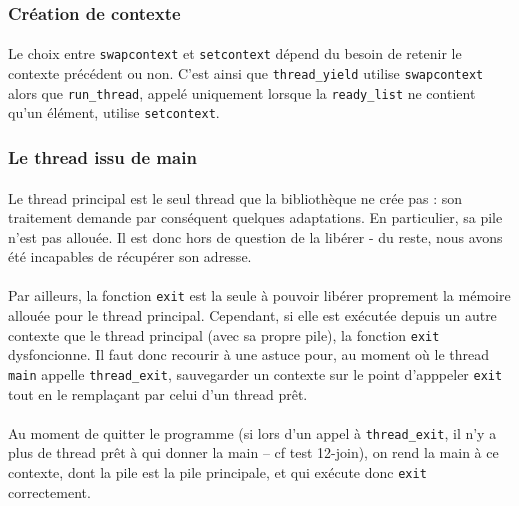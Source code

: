 \subsubsection{Création de contexte}

\paragraph{}
Le choix entre \texttt{swapcontext} et \texttt{setcontext} dépend du
 besoin de retenir le contexte précédent ou non. C'est ainsi que 
\texttt{thread\_yield} utilise \texttt{swapcontext} alors que 
\texttt{run\_thread}, appelé uniquement lorsque la \texttt{ready\_list}
ne contient qu'un élément, utilise \texttt{setcontext}. 

\subsubsection{Le thread issu de main}

\paragraph{}
Le thread principal est le seul thread que la bibliothèque ne crée
pas : son traitement demande par conséquent quelques adaptations.
En particulier, sa pile n'est pas allouée. Il est donc hors de
question de la libérer - du reste, nous avons été incapables de
récupérer son adresse.

\paragraph{}
Par ailleurs, la fonction \texttt{exit} est la seule à pouvoir libérer proprement la mémoire
allouée pour le thread principal. Cependant, si elle est exécutée depuis un autre contexte que le thread principal
(avec sa propre pile), la fonction \texttt{exit} dysfoncionne.
Il faut donc recourir à une astuce pour, au moment où le thread \texttt{main}
appelle \texttt{thread\_exit}, sauvegarder un contexte sur le point
d'apppeler \texttt{exit} tout en le remplaçant par celui d'un thread
prêt.

\paragraph{}
Au moment de quitter le programme (si lors d'un appel à
\texttt{thread\_exit}, il n'y a plus de thread prêt à qui donner la
main -- cf test 12-join), on rend la main à ce contexte, dont la pile
est la pile principale, et qui exécute donc \texttt{exit} correctement.
